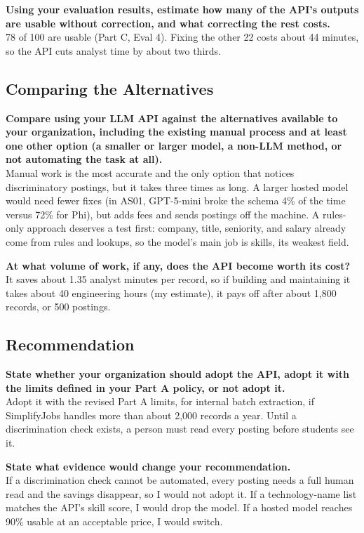 \documentclass[11pt]{article}
\newcommand{\q}[1]{\par\noindent\textbf{#1}\\}
\begin{document}
\q{Using your evaluation results, estimate how many of the API's outputs are usable without correction, and what correcting the rest costs.}
78 of 100 are usable (Part C, Eval 4). Fixing the other 22 costs about 44 minutes, so the API cuts analyst time by about two thirds.

\subsection{Comparing the Alternatives}

\q{Compare using your LLM API against the alternatives available to your organization, including the existing manual process and at least one other option (a smaller or larger model, a non-LLM method, or not automating the task at all).}
Manual work is the most accurate and the only option that notices discriminatory postings, but it takes three times as long. A larger hosted model would need fewer fixes (in AS01, GPT-5-mini broke the schema 4\% of the time versus 72\% for Phi), but adds fees and sends postings off the machine. A rules-only approach deserves a test first: company, title, seniority, and salary already come from rules and lookups, so the model's main job is skills, its weakest field.

\q{At what volume of work, if any, does the API become worth its cost?}
It saves about 1.35 analyst minutes per record, so if building and maintaining it takes about 40 engineering hours (my estimate), it pays off after about 1,800 records, or 500 postings.

\subsection{Recommendation}

\q{State whether your organization should adopt the API, adopt it with the limits defined in your Part A policy, or not adopt it.}
Adopt it with the revised Part A limits, for internal batch extraction, if SimplifyJobs handles more than about 2,000 records a year. Until a discrimination check exists, a person must read every posting before students see it.

\q{State what evidence would change your recommendation.}
If a discrimination check cannot be automated, every posting needs a full human read and the savings disappear, so I would not adopt it. If a technology-name list matches the API's skill score, I would drop the model. If a hosted model reaches 90\% usable at an acceptable price, I would switch.
\end{document}
